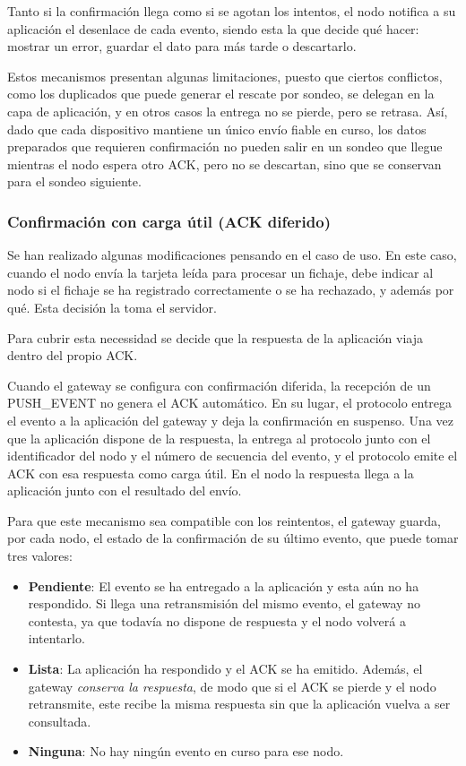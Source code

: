 Tanto si la confirmación llega como si se agotan los intentos, el nodo notifica a su aplicación el desenlace de cada evento, siendo esta la que decide qué hacer: mostrar un error, guardar el dato para más tarde o descartarlo.

Estos mecanismos presentan algunas limitaciones, puesto que ciertos conflictos, como los duplicados que puede generar el rescate por sondeo, se delegan en la capa de aplicación, y en otros casos la entrega no se pierde, pero se retrasa. Así, dado que cada dispositivo mantiene un único envío fiable en curso, los datos preparados que requieren confirmación no pueden salir en un sondeo que llegue mientras el nodo espera otro ACK, pero no se descartan, sino que se conservan para el sondeo siguiente.

\subsubsection{Confirmación con carga útil (ACK diferido)}\label{sec:ackdiferido}

Se han realizado algunas modificaciones pensando en el caso de uso. En este caso, cuando el nodo envía la tarjeta leída para procesar un fichaje, debe indicar al nodo si el fichaje se ha registrado correctamente o se ha rechazado, y además por qué. Esta decisión la toma el servidor.

Para cubrir esta necessidad se decide que la respuesta de la aplicación viaja dentro del propio ACK.

Cuando el gateway se configura con confirmación diferida, la recepción de un PUSH\_EVENT no genera el ACK automático. En su lugar, el protocolo entrega el evento a la aplicación del gateway y deja la confirmación en suspenso. Una vez que la aplicación dispone de la respuesta, la entrega al protocolo junto con el identificador del nodo y el número de secuencia del evento, y el protocolo emite el ACK con esa respuesta como carga útil. En el nodo la respuesta llega a la aplicación junto con el resultado del envío.

Para que este mecanismo sea compatible con los reintentos, el gateway guarda, por cada nodo, el estado de la confirmación de su último evento, que puede tomar tres valores:

\begin{itemize}
\item \textbf{Pendiente}: El evento se ha entregado a la aplicación y esta aún no ha respondido. Si llega una retransmisión del mismo evento, el gateway no contesta, ya que todavía no dispone de respuesta y el nodo volverá a intentarlo.
\item \textbf{Lista}: La aplicación ha respondido y el ACK se ha emitido. Además, el gateway \emph{conserva la respuesta}, de modo que si el ACK se pierde y el nodo retransmite, este recibe la misma respuesta sin que la aplicación vuelva a ser consultada.
\item \textbf{Ninguna}: No hay ningún evento en curso para ese nodo.
\end{itemize}

